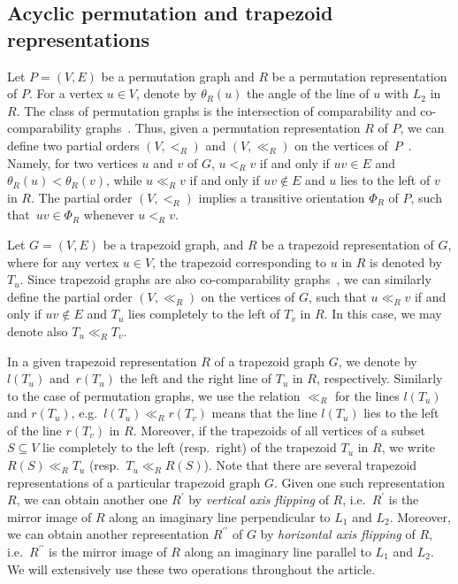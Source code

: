 \documentclass[proceedings]{stacs}
\begin{document}
\subsection{Acyclic permutation and trapezoid representations\label{acyclic}}

Let $P=(V,E)$ be a permutation graph and $R$ be a permutation representation of $P$. 
For a vertex $u\in V$, denote by $\theta _{R}(u)$ the angle of the line of $u$ 
with $L_{2}$ in $R$. The class of permutation graphs is the intersection
of comparability and co-comparability graphs~\cite{Golumbic04}. Thus, given
a permutation representation $R$ of $P$, we can define two partial orders $%
(V,<_{R})$ and $(V,\ll _{R})$ on the vertices of~$P$~\cite{Golumbic04}.
Namely, for two vertices $u$ and $v$ of $G$, $u<_{R}v$ if and only if $uv\in
E$ and $\theta _{R}(u)<\theta _{R}(v)$, while $u\ll _{R}v$ if and only if 
$uv\notin E$ and $u$ lies to the left of $v$ in $R$. The partial order 
$(V,<_{R})$ implies a transitive orientation $\Phi _{R}$ of $P$, 
such that~$uv\in \Phi _{R}$ whenever $u<_{R}v$.

Let $G=(V,E)$ be a trapezoid graph, and $R$ be a trapezoid representation of 
$G$, where for any vertex $u\in V$, the trapezoid corresponding to $u$ in $R$
is denoted by $T_{u}$. Since trapezoid graphs are also co-comparability
graphs~\cite{Golumbic04}, we can similarly define the partial order $%
(V,\ll_{R})$ on the vertices of $G$, such that $u\ll _{R}v$ if and only if $%
uv\notin E$ and $T_{u}$ lies completely to the left of $T_{v}$ in $R$. In
this case, we may denote also $T_{u}\ll_{R}T_{v}$. %

In a given trapezoid representation $R$ of a trapezoid graph $G$, we denote
by~$l(T_{u})$ and~$r(T_{u})$ the left and the right line of $T_{u}$ in $R$,
respectively. Similarly to the case of permutation graphs, we use the
relation $\ll _{R}$ for the lines $l(T_{u})$ and $r(T_{u})$, e.g.~${l(T_{u})\ll _{R}r(T_{v})}$ 
means that the line $l(T_{u})$ lies to the left of
the line $r(T_{v})$ in $R$. Moreover, if the trapezoids of all vertices of a
subset $S\subseteq V$ lie completely to the left (resp.~right) of the
trapezoid $T_{u}$ in $R$, we write $R(S)\ll _{R}T_{u}$ (resp.~$T_{u}\ll
_{R}R(S)$). Note that there are several trapezoid representations of a
particular trapezoid graph $G$. Given one such representation $R$, we can
obtain another one $R^{\prime }$ by \emph{vertical axis flipping} of $R$,
i.e.~$R^{\prime }$ is the mirror image of $R$ along an imaginary line
perpendicular to $L_{1}$ and $L_{2}$. Moreover, we can obtain another
representation $R^{\prime \prime }$ of $G$ by \emph{horizontal axis flipping}
of $R$, i.e.~$R^{\prime \prime }$ is the mirror image of $R$ along an
imaginary line parallel to $L_{1}$ and $L_{2}$. We will extensively use 
these two operations throughout the article.
\end{document}
